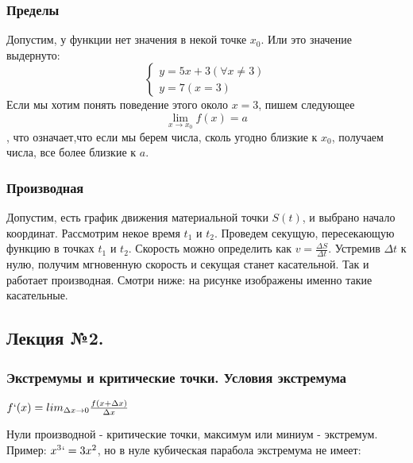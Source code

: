 \documentclass{article}
\begin{document}
\subsubsection{Пределы}

Допустим, у функции нет значения в некой точке $x_0$. Или это значение выдернуто:
$$
\begin{cases}
y=5x+3 (\forall x \neq 3)
\\
y=7 (x = 3)
\end{cases}
$$
Если мы хотим понять поведение этого около $x=3$, пишем следующее
$$\lim_{x \to x_0}{f(x)} = a$$
, что означает,что если мы берем числа, сколь угодно близкие к $x_0$, получаем числа, все более близкие к $a$.

\subsubsection{Производная}
Допустим, есть график движения материальной точки $S(t)$, и выбрано начало координат. Рассмотрим некое время $t_1$ и $t_2$. Проведем секущую, пересекающую функцию в точках $t_1$ и $t_2$. Скорость можно определить как $v=\frac{\Delta S}{ \Delta{t}}$. Устремив $\Delta t$ к нулю, получим мгновенную скорость и секущая станет касательной. Так и работает производная. Смотри ниже: на рисунке изображены именно такие касательные.


\subsection{Лекция №2.}

\subsubsection{Экстремумы и критические точки. Условия экстремума}

$f`(x) = lim_{\Delta x \to 0}\frac{f(x+\Delta x)}{\Delta x}$

Нули производной - критические точки, максимум или миниум - экстремум. Пример:
$x^3` = 3x^2$, но в нуле кубическая парабола экстремума не имеет:
\end{document}
